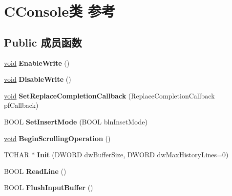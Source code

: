 \hypertarget{class_c_console}{}\section{C\+Console类 参考}
\label{class_c_console}
\subsection*{Public 成员函数}
\begin{DoxyCompactItemize}
\item 
\mbox{\label{class_c_console_aeb17cde4cf90f9359199cf8b49436cdc}} 
\hyperlink{interfacevoid}{void} {\bfseries Enable\+Write} ()
\item 
\mbox{\label{class_c_console_ac54dd48467180fc55cb00b346adb4845}} 
\hyperlink{interfacevoid}{void} {\bfseries Disable\+Write} ()
\item 
\mbox{\label{class_c_console_afc67ab5d963d7c88038bb5aaebfed7db}} 
\hyperlink{interfacevoid}{void} {\bfseries Set\+Replace\+Completion\+Callback} (Replace\+Completion\+Callback pf\+Callback)
\item 
\mbox{\label{class_c_console_a230f33325a3c48551ec14a8751a9139f}} 
B\+O\+OL {\bfseries Set\+Insert\+Mode} (B\+O\+OL bln\+Inset\+Mode)
\item 
\mbox{\label{class_c_console_a46e6227d1fe366d0bce91051c0dc61bc}} 
\hyperlink{interfacevoid}{void} {\bfseries Begin\+Scrolling\+Operation} ()
\item 
\mbox{\label{class_c_console_a6a35b0462743a420d6e606c8e87cfdb3}} 
T\+C\+H\+AR $\ast$ {\bfseries Init} (D\+W\+O\+RD dw\+Buffer\+Size, D\+W\+O\+RD dw\+Max\+History\+Lines=0)
\item 
\mbox{\label{class_c_console_acf4bff47e715ca3739684efbbccdc900}} 
B\+O\+OL {\bfseries Read\+Line} ()
\item 
\mbox{\label{class_c_console_a3e274ede805cd9d1ea34f6ba89e7c491}} 
B\+O\+OL {\bfseries Flush\+Input\+Buffer} ()
\item 
\mbox{\label{class_c_console_a65e8954232e9f56324f8781bd607dbbb}} 

\end{DoxyCompactItemize}
